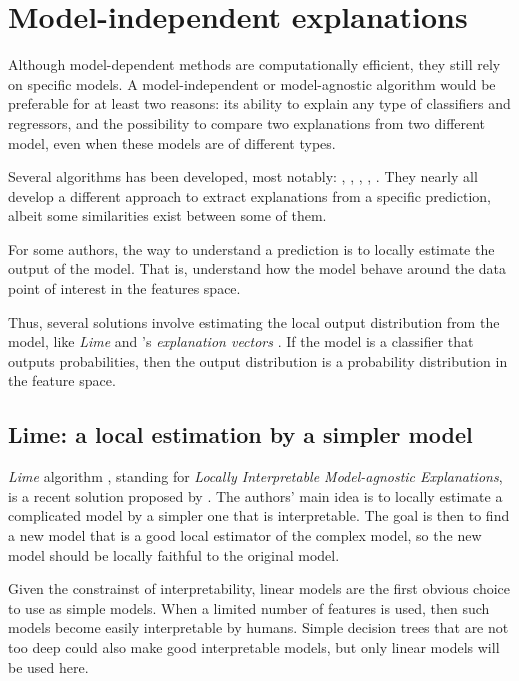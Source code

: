 \documentclass[a4paper,11pt]{kth-mag}
\begin{document}
\section{Model-independent explanations}

Although model-dependent methods are computationally efficient, they still rely on specific models. A model-independent or model-agnostic algorithm would be preferable for at least two reasons: its ability to explain any type of classifiers and regressors, and the possibility to compare two explanations from two different model, even when these models are of different types.

Several algorithms has been developed, most notably: \cite{lime}, \cite{explvect}, \cite{ice}, \cite{gametheory}, \cite{documentclassif}. They nearly all develop a different approach to extract explanations from a specific prediction, albeit some similarities exist between some of them.

For some authors, the way to understand a prediction is to locally estimate the output of the model. That is, understand how the model behave around the data point of interest in the features space.

Thus, several solutions involve estimating the local output distribution from the model, like \textit{Lime} \cite{lime} and \citeauthor{explvect}'s \textit{explanation vectors} \cite{explvect}. If the model is a classifier that outputs probabilities, then the output distribution is a probability distribution in the feature space. 

\subsection{Lime: a local estimation by a simpler model}

\textit{Lime} algorithm \cite{lime}, standing for \textit{Locally Interpretable Model-agnostic Explanations}, is a recent solution proposed by \citeauthor{lime}. The authors' main idea is to locally estimate a complicated model by a simpler one that is interpretable. The goal is then to find a new model that is a good local estimator of the complex model, so the new model should be locally faithful to the original model.

Given the constrainst of interpretability, linear models are the first obvious choice to use as simple models. When a limited number of features is used, then such models become easily interpretable by humans. Simple decision trees that are not too deep could also make good interpretable models, but only linear models will be used here.
\end{document}
